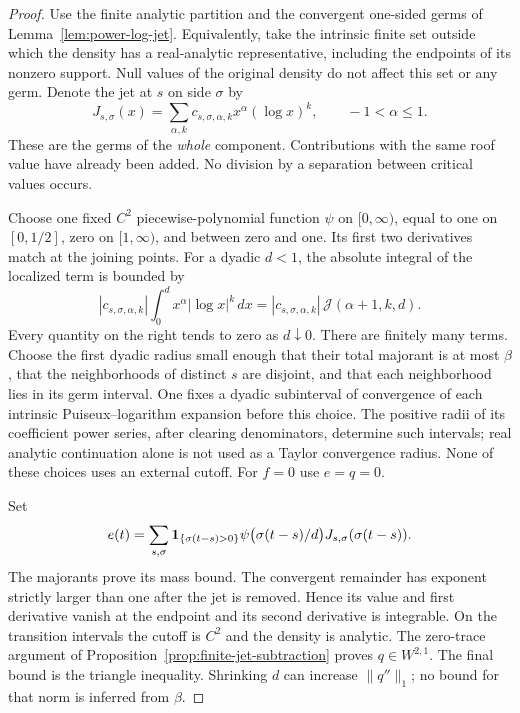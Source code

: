 \begin{proof}
Use the finite analytic partition and the convergent one-sided germs
of Lemma~\ref{lem:power-log-jet}. Equivalently, take the intrinsic
finite set outside which the density has a real-analytic representative,
including the endpoints of its nonzero support. Null values of the
original density do not affect this set or any germ. Denote the jet
at $s$ on side $\sigma$ by
\[
 J_{s,\sigma}(x)=\sum_{\alpha,k}c_{s,\sigma,\alpha,k}
                         x^\alpha(\log x)^k,\qquad -1<\alpha\le1.
\]
These are the germs of the \emph{whole} component. Contributions with
the same roof value have already been added. No division by a
separation between critical values occurs.

Choose one fixed $C^2$ piecewise-polynomial function $\psi$ on
$[0,\infty)$, equal to one on $[0,1/2]$, zero on $[1,\infty)$,
and between zero and one. Its first two derivatives match at the
joining points. For a dyadic $d<1$, the absolute integral of the
localized term is bounded by
\begin{equation}\label{eq:v43-jet-majorant}
 |c_{s,\sigma,\alpha,k}|\int_0^d x^\alpha|\log x|^k\,dx
 =|c_{s,\sigma,\alpha,k}|\,\mathcal J(\alpha+1,k,d).
\end{equation}
Every quantity on the right tends to zero as $d\downarrow0$.
There are finitely many terms. Choose the first dyadic radius small
enough that their total majorant is at most $\beta$, that the
neighborhoods of distinct $s$ are disjoint, and that each neighborhood
lies in its germ interval. One fixes a dyadic subinterval of convergence of each intrinsic
Puiseux--logarithm expansion before this choice. The positive radii
of its coefficient power series, after clearing denominators, determine
such intervals; real analytic continuation alone is not used as a
Taylor convergence radius. None of these choices uses an external cutoff.
For $f=0$ use $e=q=0$.

Set
\[
 e(t)=\sum_{s,\sigma}\mathbf1_{\{\sigma(t-s)>0\}}
       \psi\bigl(\sigma(t-s)/d\bigr)J_{s,\sigma}(\sigma(t-s)).
\]
The majorants prove its mass bound. The convergent remainder has
exponent strictly larger than one after the jet is removed. Hence its
value and first derivative vanish at the endpoint and its second
derivative is integrable. On the transition intervals the cutoff is
$C^2$ and the density is analytic. The zero-trace argument of
Proposition~\ref{prop:finite-jet-subtraction} proves $q\in W^{2,1}$.
The final bound is the triangle inequality. Shrinking $d$ can increase
$\|q''\|_1$; no bound for that norm is inferred from $\beta$.
\end{proof}

